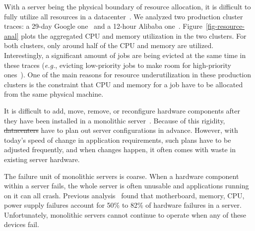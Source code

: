 \documentclass[10pt,times,twocolumn]{z2-article}
\newcommand{\eg}{\textit{e.g.}}
\providecommand{\DIFaddtex}[1]{{\protect\color{blue}\uwave{#1}}} %
\providecommand{\DIFdeltex}[1]{{\protect\color{red}\sout{#1}}}                      %
\providecommand{\DIFaddbegin}{} %
\providecommand{\DIFaddend}{} %
\providecommand{\DIFdelbegin}{} %
\providecommand{\DIFdelend}{} %
\providecommand{\DIFadd}[1]{\texorpdfstring{\DIFaddtex{#1}}{#1}} %
\providecommand{\DIFdel}[1]{\texorpdfstring{\DIFdeltex{#1}}{}} %
\newcommand{\DIFscaledelfig}{0.5}
\newlength{\DIFdelgraphicswidth} %
\newlength{\DIFdelgraphicsheight} %
\newcommand{\DIFaddincludegraphics}[2][]{{\color{blue}\fbox{\DIFOincludegraphics[#1]{#2}}}} %
\newcommand{\DIFdelincludegraphics}[2][]{%
\sbox{\DIFdelgraphicsbox}{\DIFOincludegraphics[#1]{#2}}%
\settoboxwidth{\DIFdelgraphicswidth}{\DIFdelgraphicsbox} %
\settoboxtotalheight{\DIFdelgraphicsheight}{\DIFdelgraphicsbox} %
\scalebox{\DIFscaledelfig}{%
\parbox[b]{\DIFdelgraphicswidth}{\usebox{\DIFdelgraphicsbox}\\[-\baselineskip] \rule{\DIFdelgraphicswidth}{0em}}\llap{\resizebox{\DIFdelgraphicswidth}{\DIFdelgraphicsheight}{%
\setlength{\unitlength}{\DIFdelgraphicswidth}%
\begin{picture}(1,1)%
\thicklines\linethickness{2pt} %
{\color[rgb]{1,0,0}\put(0,0){\framebox(1,1){}}}%
{\color[rgb]{1,0,0}\put(0,0){\line( 1,1){1}}}%
{\color[rgb]{1,0,0}\put(0,1){\line(1,-1){1}}}%
\end{picture}%
}\hspace*{3pt}}} %
} %
\DeclareRobustCommand{\DIFaddbegin}{\DIFOaddbegin \let\includegraphics\DIFaddincludegraphics} %
\DeclareRobustCommand{\DIFaddend}{\DIFOaddend \let\includegraphics\DIFOincludegraphics} %
\DeclareRobustCommand{\DIFdelbegin}{\DIFOdelbegin \let\includegraphics\DIFdelincludegraphics} %
\DeclareRobustCommand{\DIFdelend}{\DIFOaddend \let\includegraphics\DIFOincludegraphics} %
\begin{document}
With a server being the physical boundary of resource allocation, 
it is difficult to fully utilize all resources in a datacenter~\cite{Barroso-COMPUTER,Quasar-ASPLOS,PowerNap}.
We analyzed two production cluster traces: a 29-day Google one~\cite{GoogleTrace}
and a 12-hour Alibaba one~\cite{AliTrace}.
Figure~\ref{fig-resource-anal} plots the aggregated CPU and memory utilization in the two clusters.
For both clusters, only around half of the CPU and memory are utilized.
Interestingly, %
a significant amount of jobs are being evicted at the same time in these traces
(\eg, evicting low-priority jobs to make room for high-priority ones~\cite{Borg}). %
One of the main reasons for resource underutilization in these production clusters is 
the constraint that CPU and memory for a job have to be allocated from 
the same physical machine.

It is difficult to add, move, remove, or reconfigure hardware components
after they have been installed in a monolithic server~\cite{FB-Wedge100}. %
Because of this rigidity, \DIFdelbegin \DIFdel{datacenters }\DIFdelend \DIFaddbegin \DIFadd{datacenter owners }\DIFaddend have to plan out server configurations in advance.
However, with today's speed of change in application requirements, such plans have to be adjusted frequently,
and when changes happen, it often comes with waste in existing server hardware.

The failure unit of monolithic servers is coarse.
When a hardware component within a server fails, %
the whole server is often unusable and applications running on it can all crash.
Previous analysis~\cite{Failure-Disk-FAST07} found that motherboard, memory, CPU, power supply failures account for 
50\% to 82\% of hardware failures in a server.
Unfortunately, monolithic servers cannot continue to operate when any of these devices fail.
\end{document}

